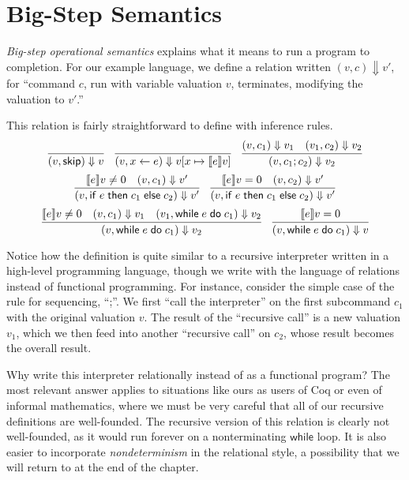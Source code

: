 \documentclass{amsbook}
\theoremstyle{definition}
\theoremstyle{remark}
\numberwithin{section}{chapter}
\numberwithin{equation}{chapter}
\begin{document}
\section{Big-Step Semantics}

\newcommand{\bigstep}[2]{#1 \Downarrow #2}

\emph{Big-step operational semantics} explains what it means to run a program to completion.
For our example language, we define a relation written $\bigstep{(v, c)}{v'}$, for ``command $c$, run with variable valuation $v$, terminates, modifying the valuation to $v'$.''

This relation is fairly straightforward to define with inference rules.
\encoding
$$\infer{\bigstep{(v, \skipe)}{v}}{}
\quad \infer{\bigstep{(v, \assign{x}{e})}{\mupd{v}{x}{\denote{e}v}}}{}
\quad \infer{\bigstep{(v, c_1; c_2)}{v_2}}{
  \bigstep{(v, c_1)}{v_1}
  & \bigstep{(v_1, c_2)}{v_2}
}$$
$$\infer{\bigstep{(v, \ifte{e}{c_1}{c_2})}{v'}}{
  \denote{e}{v} \neq 0
  & \bigstep{(v, c_1)}{v'}
}
\quad \infer{\bigstep{(v, \ifte{e}{c_1}{c_2})}{v'}}{
  \denote{e}{v} = 0
  & \bigstep{(v, c_2)}{v'}
}$$
$$\infer{\bigstep{(v, \while{e}{c_1})}{v_2}}{
  \denote{e}{v} \neq 0
  & \bigstep{(v, c_1)}{v_1}
  & \bigstep{(v_1, \while{e}{c_1})}{v_2}
}
\quad \infer{\bigstep{(v, \while{e}{c_1})}{v}}{
  \denote{e}{v} = 0
}$$

Notice how the definition is quite similar to a recursive interpreter written in a high-level programming language, though we write with the language of relations instead of functional programming.
For instance, consider the simple case of the rule for sequencing, ``;''.
We first ``call the interpreter'' on the first subcommand $c_1$ with the original valuation $v$.
The result of the ``recursive call'' is a new valuation $v_1$, which we then feed into another ``recursive call'' on $c_2$, whose result becomes the overall result.

Why write this interpreter relationally instead of as a functional program?
The most relevant answer applies to situations like ours as users of Coq or even of informal mathematics, where we must be very careful that all of our recursive definitions are well-founded.
The recursive version of this relation is clearly not well-founded, as it would run forever on a nonterminating $\mathsf{while}$ loop.
It is also easier to incorporate \emph{nondeterminism} in the relational style, a possibility that we will return to at the end of the chapter.
\end{document}
